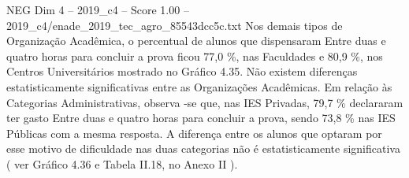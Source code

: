 \begin{textsample}{NEG Dim 4 – 2019\_c4 – Score 1.00 – 2019\_c4/enade\_2019\_tec\_agro\_85543dcc5c.txt}
Nos demais tipos de Organização Acadêmica, o percentual de alunos que dispensaram Entre duas e quatro horas para concluir a prova ficou 77,0 \%, nas Faculdades e 80,9 \%, nos Centros Universitários mostrado no Gráfico 4.35.
Não existem diferenças estatisticamente significativas entre as Organizações Acadêmicas.
Em relação às Categorias Administrativas, observa -se que, nas IES Privadas, 79,7 \% declararam ter gasto Entre duas e quatro horas para concluir a prova, sendo 73,8 \% nas IES Públicas com a mesma resposta.
A diferença entre os alunos que optaram por esse motivo de dificuldade nas duas categorias não é estatisticamente significativa ( ver Gráfico 4.36 e Tabela II.18, no Anexo II ).

\end{textsample}
